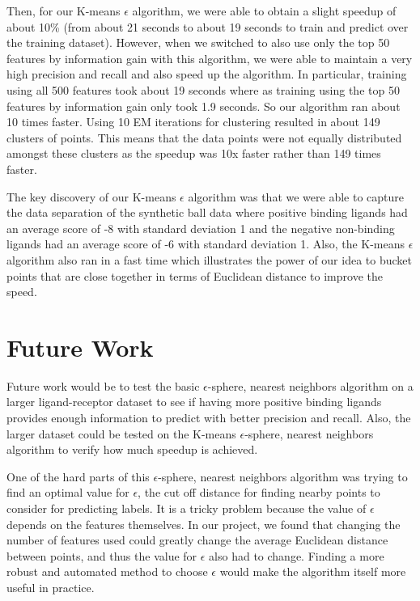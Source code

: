 \documentclass[11pt,letterpaper]{article}
\begin{document}
Then, for our K-means $\epsilon$ algorithm, we were able to obtain a slight speedup of about 10\% (from about 21
seconds to about 19 seconds to train and predict over the training dataset).  However, when we switched to also use only the top 50 features by information gain with this algorithm, we were able to maintain a very high precision and recall and also speed up the algorithm.  In particular, training using all 500 features took about 19 seconds where as training using the top 50 features by information gain only took 1.9 seconds.  So our algorithm ran about 10 times faster.  Using 10 EM iterations for clustering resulted in about 149 clusters of points.  This means that the data points were not equally distributed amongst these clusters as the speedup was 10x faster rather than 149 times faster.

The key discovery of our K-means $\epsilon$ algorithm was that we were able to capture the data separation of the synthetic ball data where positive binding ligands had an average score of -8 with standard deviation 1 and the negative non-binding ligands had an average score of -6 with standard deviation 1.  Also, the K-means $\epsilon$ algorithm also ran in a fast time which illustrates the power of our idea to bucket points that are close together in terms of Euclidean distance to improve the speed.

\section{Future Work}
Future work would be to test the basic $\epsilon$-sphere, nearest neighbors algorithm on a larger ligand-receptor dataset to see if having more positive binding ligands provides enough information to predict with better precision and recall.  Also, the larger dataset could be tested on the K-means $\epsilon$-sphere, nearest neighbors algorithm to verify how much speedup is achieved.

One of the hard parts of this $\epsilon$-sphere, nearest neighbors algorithm was trying to find an optimal value for $\epsilon$, the cut off distance for finding nearby points to consider for predicting labels.  It is a tricky problem because the value of $\epsilon$ depends on the features themselves.  In our project, we found that changing the number of features used could greatly change the average Euclidean distance between points, and thus the value for $\epsilon$ also had to change.  Finding a more robust and automated method to choose $\epsilon$ would make the algorithm itself more useful in practice.
\end{document}
